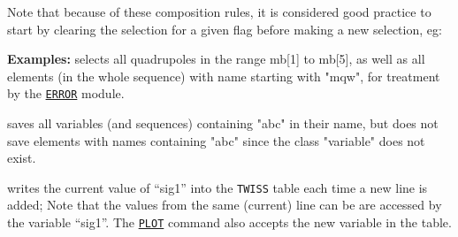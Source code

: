 Note that because of these composition rules, it is considered good
practice to start by clearing the selection for a given flag before
making a new selection, eg: 


\vskip 5mm
{\bf Examples:} 
selects all quadrupoles in the range mb[1] to mb[5], as well as all
elements (in the whole sequence) with name starting with "mqw", for 
treatment by the \hyperref[chap:error]{\tt ERROR} module.  

\vskip 5mm
saves all variables (and sequences) containing "abc" in their name, 
but does not save elements with names containing "abc" since the class
"variable" does not exist.  

\vskip 5mm
writes the current value of ``sig1'' into the {\tt TWISS} table each
time a new line is added; Note that the values from the same (current)
line can be are accessed by the variable ``sig1''.
The \hyperref[chap:plot]{\tt PLOT} command also accepts the new variable 
in the table.  



